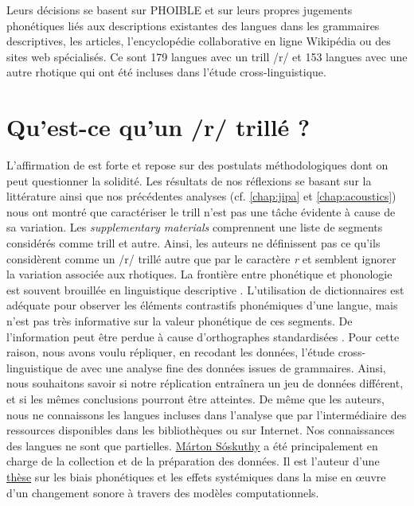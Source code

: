 Leurs décisions se basent sur PHOIBLE \parencite{phoible} et sur leurs propres jugements phonétiques liés aux descriptions existantes des langues dans les grammaires descriptives, les articles, l'encyclopédie collaborative en ligne Wikipédia ou des sites web spécialisés.
Ce sont 179 langues avec un trill /r/ et 153 langues avec une autre rhotique qui ont été incluses dans l'étude cross-linguistique.

\section{Qu'est-ce qu'un /r/ trillé ?}

L'affirmation de \textcite{winterTrilledAssociatedRoughness2022} est forte et repose sur des postulats méthodologiques dont on peut questionner la solidité. Les résultats de nos réflexions se basant sur la littérature ainsi que nos précédentes analyses (cf. \autoref{chap:jipa} et \autoref{chap:acoustics}) nous ont montré que caractériser le trill n’est pas une tâche évidente à cause de sa variation. 
Les \textit{supplementary materials} comprennent une liste de segments considérés comme trill et autre. Ainsi, les auteurs ne définissent pas ce qu'ils considèrent comme un /r/ trillé autre que par le caractère \textit{r} et semblent ignorer la variation associée aux rhotiques. 
La frontière entre phonétique et phonologie est souvent brouillée en linguistique descriptive \parencite{maddiesonPhoneticAdequacyDescriptive2021}. L'utilisation de dictionnaires est adéquate pour observer les éléments contrastifs phonémiques d'une langue, mais n'est pas très informative sur la valeur phonétique de ces segments. De l'information peut être perdue à cause d'orthographes standardisées \parencite[130]{riceIssuesStandardizationCommunity2002}. Pour cette raison, nous avons voulu répliquer, en recodant les données, l'étude cross-linguistique de \textcite{winterTrilledAssociatedRoughness2022} avec une analyse fine des données issues de grammaires.
Ainsi, nous souhaitons savoir si notre réplication entraînera un jeu de données différent, et si les mêmes conclusions pourront être atteintes.
De même que les auteurs, nous ne connaissons les langues incluses dans l'analyse que par l'intermédiaire des ressources disponibles dans les bibliothèques ou sur Internet. Nos connaissances des langues ne sont que partielles.
\href{https://soskuthy.github.io/}{Márton Sóskuthy} a été principalement en charge de la collection et de la préparation des données. Il est l'auteur d'une \href{https://era.ed.ac.uk/handle/1842/8946}{thèse} \parencite{soskuthyPhoneticBiasesSystemic2013} sur les biais phonétiques et les effets systémiques dans la mise en œuvre d'un changement sonore à travers des modèles computationnels.\\

